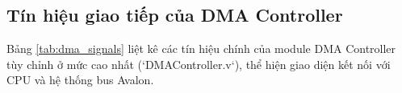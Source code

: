 
\subsection{Tín hiệu giao tiếp của DMA Controller} %
Bảng \ref{tab:dma_signals} liệt kê các tín hiệu chính của module DMA Controller tùy chỉnh ở mức cao nhất (`DMAController.v`), thể hiện giao diện kết nối với CPU và hệ thống bus Avalon.

